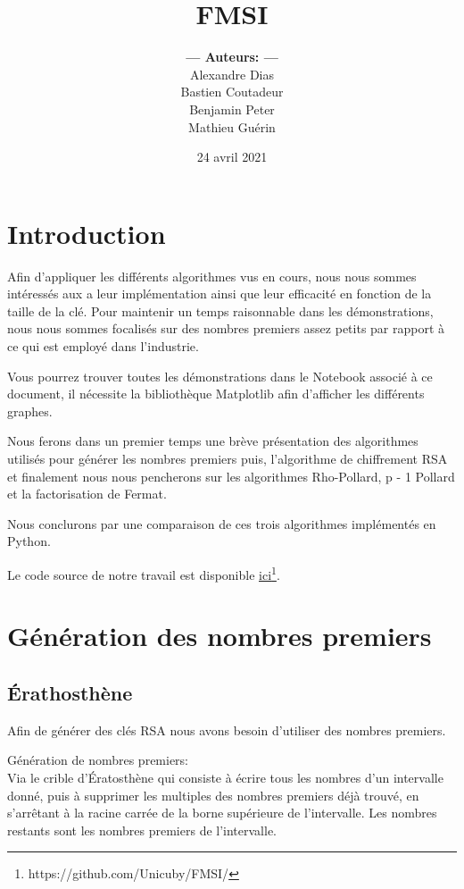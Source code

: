 \documentclass[a4paper, 12pt]{article}
\title{
    {\bf FMSI}
}
\author{
    { \bf --- Auteurs: --- }
    \\ Alexandre Dias
    \\ Bastien Coutadeur
    \\ Benjamin Peter
    \\ Mathieu Guérin
}
\date{24 avril 2021}
\begin{document}
\maketitle

\tableofcontents


\newpage
\section{Introduction}

Afin d'appliquer les différents algorithmes vus en cours, nous nous sommes intéressés aux a leur implémentation ainsi que leur efficacité en fonction de la taille de la clé.
Pour maintenir un temps raisonnable dans les démonstrations, nous nous sommes focalisés sur des nombres 
premiers assez petits par rapport à ce qui est employé dans l'industrie.

Vous pourrez trouver toutes les démonstrations dans le Notebook associé à ce document, il nécessite la bibliothèque Matplotlib afin d'afficher les différents graphes.

Nous ferons dans un premier temps une brève présentation des algorithmes utilisés pour générer les nombres premiers puis, l'algorithme de chiffrement RSA et finalement nous nous pencherons sur les algorithmes Rho-Pollard, p - 1 Pollard et la factorisation de Fermat.

Nous conclurons par une comparaison de ces trois algorithmes implémentés en Python.

Le code source de notre travail est disponible \underline{\href{https://github.com/Unicuby/FMSI/}{ici}}\footnote{https://github.com/Unicuby/FMSI/}.


\newpage
\section{Génération des nombres premiers}
\subsection{Érathosthène}

Afin de générer des clés RSA nous avons besoin d'utiliser des nombres premiers.

Génération de nombres premiers: \\
Via le crible d'Ératosthène qui consiste à écrire tous les nombres d'un intervalle donné, puis à supprimer les multiples des nombres premiers déjà trouvé, en s'arrêtant à la racine carrée de la borne supérieure de l'intervalle. Les nombres restants sont les nombres premiers de l'intervalle.
\end{document}

